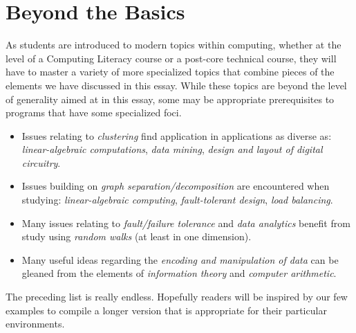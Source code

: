 \section{Beyond the Basics}

As students are introduced to modern topics within computing, whether
at the level of a Computing Literacy course or a post-core technical
course, they will have to master a variety of more specialized topics
that combine pieces of the elements we have discussed in this essay.
While these topics are beyond the level of generality aimed at in this
essay, some may be appropriate prerequisites to programs that have
some specialized foci.
\begin{itemize}
\item
Issues relating to {\em clustering} find application in applications as
diverse as: {\em linear-algebraic computations}, {\em data mining},
{\em design and layout of digital circuitry}.

\item
Issues building on {\em graph separation/decomposition} are
encountered when studying: {\em linear-algebraic computing}, {\em
  fault-tolerant design}, {\em load balancing}.

\item
Many issues relating to {\em fault/failure tolerance} and {\em data
  analytics} benefit from study using {\em random walks} (at least in
one dimension).

\item
Many useful ideas regarding the {\em encoding and manipulation of
  data} can be gleaned from the elements of {\em information theory}
and {\em computer arithmetic}.
\end{itemize}
The preceding list is really endless.  Hopefully readers will be
inspired by our few examples to compile a longer version that is
appropriate for their particular environments.





